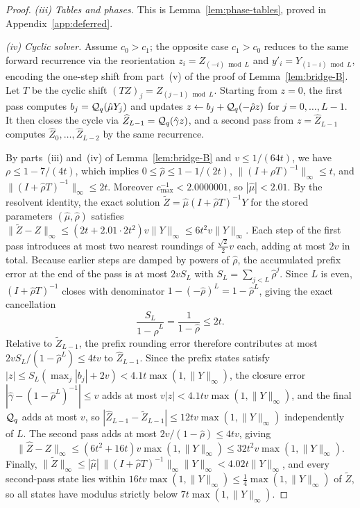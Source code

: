 \begin{proof}
\emph{(iii) Tables and phases.} This is Lemma~\ref{lem:phase-tables}, proved in Appendix~\ref{app:deferred}.

\emph{(iv) Cyclic solver.} Assume $c_0>c_1$; the opposite case $c_1>c_0$ reduces to the same forward recurrence via the
reorientation $z_i=Z_{(-i)\bmod L}$ and $y'_i=Y_{(1-i)\bmod L}$, encoding the one-step shift from part~(v) of the proof
of Lemma~\ref{lem:bridge-B}. Let $T$ be the cyclic shift $(TZ)_j=Z_{(j-1)\bmod L}$. Starting from $z=0$, the first pass
computes $b_j=\mathcal{Q}_q(\hat\mu Y_j)$ and updates $z\leftarrow b_j+\mathcal{Q}_q(-\hat\rho z)$ for $j=0,\dots,L-1$. It then
closes the cycle via $\widehat Z_{L-1}=\mathcal{Q}_q(\hat\gamma z)$, and a second pass from $z=\widehat Z_{L-1}$ computes
$\widehat Z_0,\dots,\widehat Z_{L-2}$ by the same recurrence.

By parts~(iii) and~(iv) of Lemma~\ref{lem:bridge-B} and $v\le 1/(64t)$, we have $\rho\le 1-7/(4t)$, which implies $0\le\hat\rho\le 1-1/(2t)$,
$\|(I+\rho T)^{-1}\|_\infty\le t$, and $\|(I+\hat\rho T)^{-1}\|_\infty\le 2t$. Moreover $c_{\max}^{-1}<2.0000001$, so
$|\hat\mu|<2.01$. By the resolvent identity, the exact solution $\tilde Z=\hat\mu(I+\hat\rho T)^{-1}Y$ for the stored
parameters $(\hat\mu,\hat\rho)$ satisfies
$\|\tilde Z-Z\|_\infty\le(2t+2.01\cdot 2t^2)v\|Y\|_\infty\le 6t^2 v\|Y\|_\infty$. Each step of the first pass introduces
at most two nearest roundings of $\frac{\sqrt2}{2}v$ each, adding at most $2v$ in total. Because earlier steps are
damped by powers of $\hat\rho$, the accumulated prefix error at the end of the pass is at most $2v S_L$ with
$S_L=\sum_{j<L}\hat\rho^j$. Since $L$ is even, $(I+\hat\rho T)^{-1}$ closes with denominator
$1-(-\hat\rho)^L=1-\hat\rho^L$, giving the exact cancellation
\[
  \frac{S_L}{1-\hat\rho^L}=\frac{1}{1-\hat\rho}\le 2t.
\]
Relative to $\tilde Z_{L-1}$, the prefix rounding error therefore contributes at most $2v S_L/(1-\hat\rho^L)\le 4tv$ to
$\widehat Z_{L-1}$. Since the prefix states satisfy
$|z|\le S_L(\max_j|b_j|+2v)<4.1t\max(1,\|Y\|_\infty)$, the closure error $|\hat\gamma-(1-\hat\rho^L)^{-1}|\le v$ adds at
most $v|z|<4.1tv\max(1,\|Y\|_\infty)$, and the final $\mathcal{Q}_q$ adds at most $v$, so
$|\widehat Z_{L-1}-\tilde Z_{L-1}|\le 12tv\max(1,\|Y\|_\infty)$ independently of $L$. The second pass adds at most
$2v/(1-\hat\rho)\le 4tv$, giving
\[
  \|\widehat Z-Z\|_\infty\le(6t^2+16t)v\max(1,\|Y\|_\infty)\le 32t^2 v\max(1,\|Y\|_\infty).
\]
Finally, $\|\tilde Z\|_\infty\le|\hat\mu|\,\|(I+\hat\rho T)^{-1}\|_\infty\|Y\|_\infty<4.02t\|Y\|_\infty$, and every
second-pass state lies within $16tv\max(1,\|Y\|_\infty)\le\tfrac14\max(1,\|Y\|_\infty)$ of $\tilde Z$, so all states have
modulus strictly below $7t\max(1,\|Y\|_\infty)$.


\end{proof}
